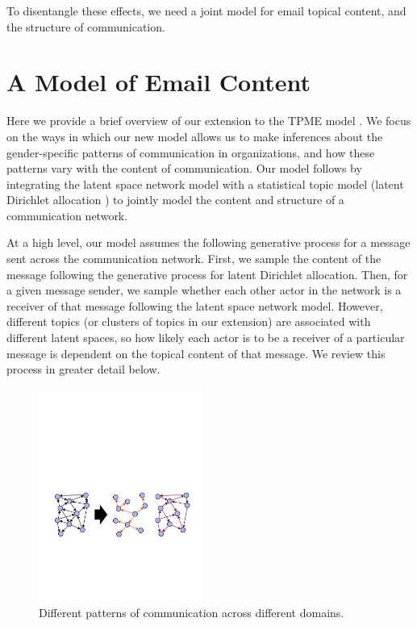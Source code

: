 \documentclass{pnastwo}
\begin{document}
\begin{article}
To disentangle these effects, we need a joint model for email topical content, and the structure of communication.
	


\section{A Model of Email Content}
Here we provide a brief overview of our extension to the TPME model \citep{Krafft2012}. We focus on the ways in which our new model allows us to make inferences about the gender-specific patterns of communication in organizations, and how these patterns vary with the content of communication. Our model follows \citep{Krafft2012} by integrating the latent space network model \citep{Hoff2002a} with a statistical topic model (latent Dirichlet allocation \cite{Blei2003}) to jointly model the content and structure of a communication network. 

At a high level, our model assumes the following generative process for a message sent across the communication network. First, we sample the content of the message following the generative process for latent Dirichlet allocation. Then, for a given message sender, we sample whether each other actor in the network is a receiver of that message following the latent space network model. However, different topics (or clusters of topics in our extension) are associated with different latent spaces, so how likely each actor is to be a receiver of a particular message is dependent on the topical content of that message. We review this process in greater detail below.  

 \begin{figure}
\caption{\label{fig:splitting} Different patterns of communication across different domains.}	
\centering
\includegraphics[width = 0.48\textwidth]{images/Structure_Matters_Full.pdf}
\end{figure}


\end{article}
\end{document}
